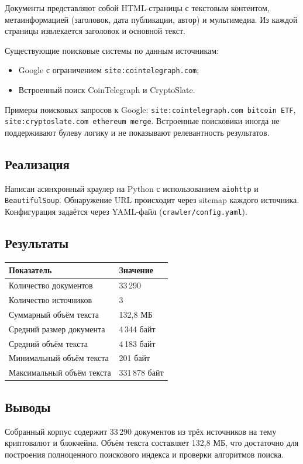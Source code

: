 \documentclass[12pt,a4paper]{article}
\begin{document}
Документы представляют собой HTML-страницы с текстовым контентом, метаинформацией
(заголовок, дата публикации, автор) и мультимедиа. Из каждой страницы извлекается
заголовок и основной текст.

Существующие поисковые системы по данным источникам:
\begin{itemize}
    \item Google с ограничением \texttt{site:cointelegraph.com};
    \item Встроенный поиск CoinTelegraph и CryptoSlate.
\end{itemize}

Примеры поисковых запросов к Google: \texttt{site:cointelegraph.com bitcoin ETF},
\texttt{site:cryptoslate.com ethereum merge}. Встроенные поисковики иногда не поддерживают
булеву логику и не показывают релевантность результатов.

\subsection{Реализация}
Написан асинхронный краулер на Python с использованием \texttt{aiohttp} и \texttt{BeautifulSoup}.
Обнаружение URL происходит через sitemap каждого источника. Конфигурация задаётся
через YAML-файл (\texttt{crawler/config.yaml}).

\subsection{Результаты}

\begin{table}[H]
\centering
\begin{tabular}{ll}
\toprule
\textbf{Показатель} & \textbf{Значение} \\
\midrule
Количество документов & 33\,290 \\
Количество источников & 3 \\
Суммарный объём текста & 132{,}8 МБ \\
Средний размер документа & 4\,344 байт \\
Средний объём текста & 4\,183 байт \\
Минимальный объём текста & 201 байт \\
Максимальный объём текста & 331\,878 байт \\
\bottomrule
\end{tabular}
\end{table}

\subsection{Выводы}
Собранный корпус содержит 33\,290 документов из трёх источников на тему
криптовалют и блокчейна. Объём текста составляет 132{,}8 МБ, что достаточно
для построения полноценного поискового индекса и проверки алгоритмов поиска.
\end{document}
